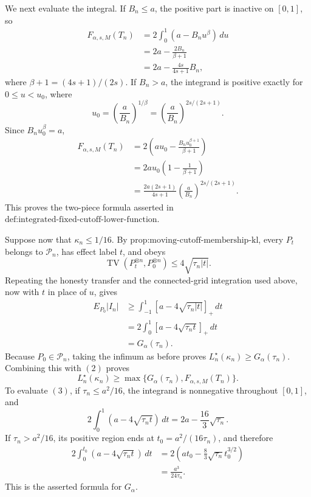 We next evaluate the integral.  If \(B_n\le a\), the positive part is
inactive on \([0,1]\), so
\[
 \begin{aligned}
 F_{\alpha,s,M}(T_n)
 &=2\int_0^1(a-B_nu^\beta)\,du\\
 &=2a-\frac{2B_n}{\beta+1}\\
 &=2a-\frac{4s}{4s+1}B_n,
 \end{aligned}
\]
where \(\beta+1=(4s+1)/(2s)\).  If \(B_n>a\), the integrand is
positive exactly for \(0\le u<u_0\), where
\[
 u_0=\left(\frac a{B_n}\right)^{1/\beta}
 =\left(\frac a{B_n}\right)^{2s/(2s+1)}.
\]
Since \(B_nu_0^\beta=a\),
\[
 \begin{aligned}
 F_{\alpha,s,M}(T_n)
 &=2\left(au_0-\frac{B_nu_0^{\beta+1}}{\beta+1}\right)\\
 &=2au_0\left(1-\frac1{\beta+1}\right)\\
 &=\frac{2a(2s+1)}{4s+1}
   \left(\frac a{B_n}\right)^{2s/(2s+1)}.
 \end{aligned}
\]
This proves the two-piece formula asserted in
\(\text{def:integrated-fixed-cutoff-lower-function}\).

Suppose now that \(\kappa_n\le1/16\).  By
\(\text{prop:moving-cutoff-membership-kl}\), every \(P_t\) belongs to
\(\mathcal P_n\), has effect label \(t\), and obeys
\[
 \operatorname{TV}(P_t^{\otimes n},P_0^{\otimes n})
 \le4\sqrt{\tau_n|t|}.
\]
Repeating the honesty transfer and the connected-grid integration used
above, now with \(t\) in place of \(u\), gives
\[
 \begin{aligned}
 E_{P_0}|I_n|
 &\ge\int_{-1}^1[a-4\sqrt{\tau_n|t|}]_+\,dt\\
 &=2\int_0^1[a-4\sqrt{\tau_nt}]_+\,dt\\
 &=G_\alpha(\tau_n).
 \tag{3}
 \end{aligned}
\]
Because \(P_0\in\mathcal P_n\), taking the infimum as before proves
\(L_n^\star(\kappa_n)\ge G_\alpha(\tau_n)\).  Combining this with
\((2)\) proves
\[
 L_n^\star(\kappa_n)
 \ge\max\{G_\alpha(\tau_n),F_{\alpha,s,M}(T_n)\}.
\]
To evaluate \((3)\), if \(\tau_n\le a^2/16\), the integrand is
nonnegative throughout \([0,1]\), and
\[
 2\int_0^1(a-4\sqrt{\tau_nt})\,dt
 =2a-\frac{16}{3}\sqrt{\tau_n}.
\]
If \(\tau_n>a^2/16\), its positive region ends at
\(t_0=a^2/(16\tau_n)\), and therefore
\[
 \begin{aligned}
 2\int_0^{t_0}(a-4\sqrt{\tau_nt})\,dt
 &=2\left(at_0-\frac83\sqrt{\tau_n}t_0^{3/2}\right)\\
 &=\frac{a^3}{24\tau_n}.
 \end{aligned}
\]
This is the asserted formula for \(G_\alpha\).

